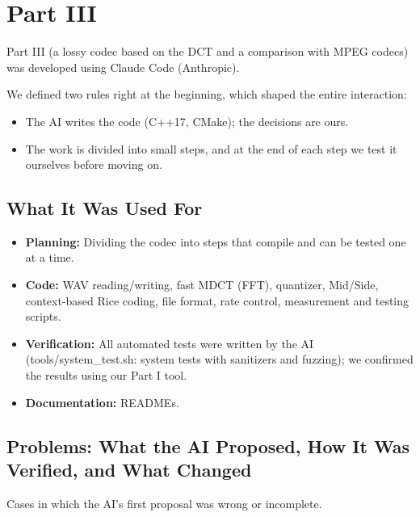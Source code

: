 \chapter{Part III}
Part III (a lossy codec based on the DCT and a comparison with MPEG
codecs) was developed using Claude Code (Anthropic).

We defined two rules right at the beginning, which shaped the entire
interaction:

\begin{itemize}
    \item The AI writes the code (C++17, CMake); the decisions are ours.
    \item The work is divided into small steps, and at the end of each
    step we test it ourselves before moving on.
\end{itemize}

\section*{What It Was Used For}

\begin{itemize}
    \item \textbf{Planning:} Dividing the codec into steps that compile
    and can be tested one at a time.

    \item \textbf{Code:} WAV reading/writing, fast MDCT (FFT),
    quantizer, Mid/Side, context-based Rice coding, file format,
    rate control, measurement and testing scripts.

    \item \textbf{Verification:} All automated tests were written by
    the AI (tools/system\_test.sh: system tests with sanitizers and
    fuzzing); we confirmed the results using our Part I tool.

    \item \textbf{Documentation:} READMEs.
\end{itemize}

\section*{Problems: What the AI Proposed, How It Was Verified, and What Changed}

Cases in which the AI's first proposal was wrong or incomplete.

